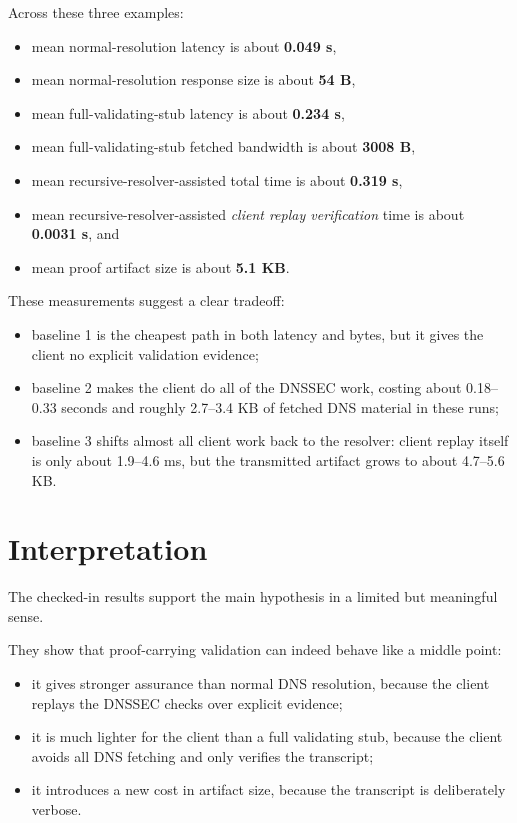\documentclass[11pt]{article}
\begin{document}
Across these three examples:

\begin{itemize}[nosep]
    \item mean normal-resolution latency is about \textbf{0.049 s},
    \item mean normal-resolution response size is about \textbf{54 B},
    \item mean full-validating-stub latency is about \textbf{0.234 s},
    \item mean full-validating-stub fetched bandwidth is about \textbf{3008 B},
    \item mean recursive-resolver-assisted total time is about \textbf{0.319 s},
    \item mean recursive-resolver-assisted \emph{client replay verification} time is about \textbf{0.0031 s}, and
    \item mean proof artifact size is about \textbf{5.1 KB}.
\end{itemize}

These measurements suggest a clear tradeoff:

\begin{itemize}[nosep]
    \item baseline 1 is the cheapest path in both latency and bytes, but it gives the client no explicit validation evidence;
    \item baseline 2 makes the client do all of the DNSSEC work, costing about 0.18--0.33 seconds and roughly 2.7--3.4 KB of fetched DNS material in these runs;
    \item baseline 3 shifts almost all client work back to the resolver: client replay itself is only about 1.9--4.6 ms, but the transmitted artifact grows to about 4.7--5.6 KB.
\end{itemize}

\section{Interpretation}

The checked-in results support the main hypothesis in a limited but meaningful sense.

They show that proof-carrying validation can indeed behave like a middle point:

\begin{itemize}[nosep]
    \item it gives stronger assurance than normal DNS resolution, because the client replays the DNSSEC checks over explicit evidence;
    \item it is much lighter for the client than a full validating stub, because the client avoids all DNS fetching and only verifies the transcript;
    \item it introduces a new cost in artifact size, because the transcript is deliberately verbose.
\end{itemize}
\end{document}
